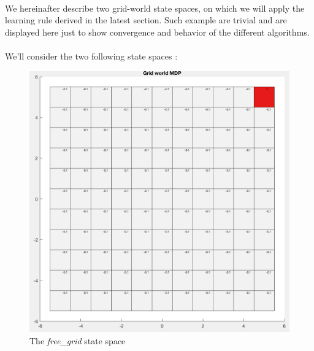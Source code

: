\documentclass[a4paper]{report}
\begin{document}
{{			\paragraph{} We hereinafter describe two grid-world state spaces, on which we will apply the learning rule derived in the latest section. Such example are trivial and are displayed here just to show convergence and behavior of the different algorithms. 
			
			\paragraph{} We'll consider the two following state spaces : 
			\begin{figure}[ht!]
				\begin{minipage}{0.4\linewidth}
					\includegraphics[width=\linewidth]{free_grid}
					\caption{The \emph{free\_grid} state space}
				\end{minipage}
				\hfill
				\begin{minipage}{0.4\linewidth}

\end{minipage}
\end{figure}}}
\end{document}

